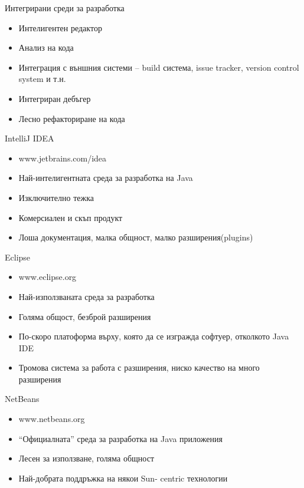 \documentclass{beamer}
\begin{document}
\begin{frame}{Интегрирани среди за разработка}
  
  \begin{itemize}
    \item Интелигентен редактор
    \item Анализ на кода
    \item Интеграция с външния системи – build
    система, issue tracker, version control
    system и т.н.
    \item Интегриран дебъгер
    \item Лесно рефакториране на кода
  \end{itemize}

\end{frame}


\begin{frame}{IntelliJ IDEA}
  \begin{itemize}
    \item www.jetbrains.com/idea
    \item Най-интелигентната среда за
    разработка на Java
    \item Изключително тежка
    \item Комерсиален и скъп продукт
    \item Лоша документация, малка общност,
    малко разширения(plugins)
  \end{itemize}
\end{frame}

\begin{frame}{Eclipse}
  \begin{itemize}
    \item www.eclipse.org
    \item Най-използваната среда за разработка
    \item Голяма общост, безброй разширения
    \item По-скоро платоформа върху, която да се
    изгражда софтуер, отколкото Java IDE
    \item Тромова система за работа с
    разширения, ниско качество на много
    разширения
  \end{itemize}
\end{frame}

\begin{frame}{NetBeans}
  
  \begin{itemize}
    \item www.netbeans.org
    \item “Официалната” среда за разработка на
    Java приложения
    \item Лесен за използване, голяма общност
    \item Най-добрата поддръжка на някои Sun-
    centric технологии
  \end{itemize}

\end{frame}
\end{document}
